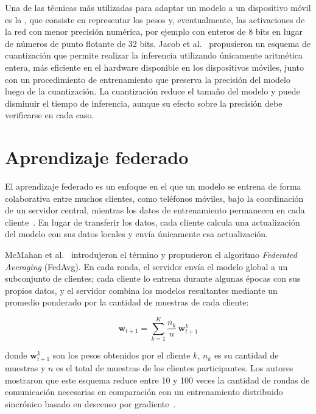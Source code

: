 Una de las técnicas más utilizadas para adaptar un modelo a un dispositivo móvil es la , que consiste en representar los pesos y, eventualmente, las activaciones de la red con menor precisión numérica, por ejemplo con enteros de 8 bits en lugar de números de punto flotante de 32 bits. Jacob et al.~\cite{jacob2018quantization} propusieron un esquema de cuantización que permite realizar la inferencia utilizando únicamente aritmética entera, más eficiente en el hardware disponible en los dispositivos móviles, junto con un procedimiento de entrenamiento que preserva la precisión del modelo luego de la cuantización. La cuantización reduce el tamaño del modelo y puede disminuir el tiempo de inferencia, aunque su efecto sobre la precisión debe verificarse en cada caso.

\section{Aprendizaje federado}

El aprendizaje federado es un enfoque en el que un modelo se entrena de forma colaborativa entre muchos clientes, como teléfonos móviles, bajo la coordinación de un servidor central, mientras los datos de entrenamiento permanecen en cada cliente~\cite{mcmahan2017fedavg, kairouz2021advances}. En lugar de transferir los datos, cada cliente calcula una actualización del modelo con sus datos locales y envía únicamente esa actualización.

McMahan et al.~\cite{mcmahan2017fedavg} introdujeron el término y propusieron el algoritmo \emph{Federated Averaging} (FedAvg). En cada ronda, el servidor envía el modelo global a un subconjunto de clientes; cada cliente lo entrena durante algunas épocas con sus propios datos, y el servidor combina los modelos resultantes mediante un promedio ponderado por la cantidad de muestras de cada cliente:

\begin{equation}
    \mathbf{w}_{t+1} = \sum_{k=1}^{K} \frac{n_k}{n} \, \mathbf{w}_{t+1}^{k}
\end{equation}

donde $\mathbf{w}_{t+1}^{k}$ son los pesos obtenidos por el cliente $k$, $n_k$ es su cantidad de muestras y $n$ es el total de muestras de los clientes participantes. Los autores mostraron que este esquema reduce entre 10 y 100 veces la cantidad de rondas de comunicación necesarias en comparación con un entrenamiento distribuido sincrónico basado en descenso por gradiente~\cite{mcmahan2017fedavg}.

